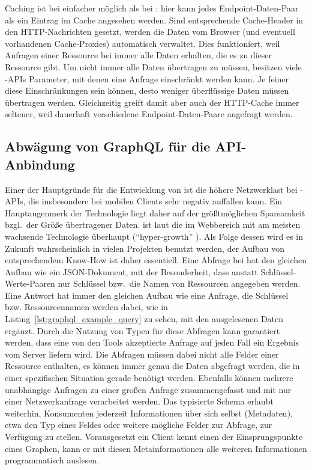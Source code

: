 Caching ist bei  einfacher möglich als bei : hier kann jedes Endpoint-Daten-Paar als ein Eintrag im Cache angesehen werden. Sind entsprechende Cache-Header in den HTTP-Nachrichten gesetzt, werden die Daten vom Browser (und eventuell vorhandenen Cache-Proxies) automatisch verwaltet. Dies funktioniert, weil Anfragen einer Ressource bei  immer alle Daten erhalten, die es zu dieser Ressource gibt. Um nicht immer alle Daten übertragen zu müssen, besitzen viele -APIs Parameter, mit denen eine Anfrage einschränkt werden kann. Je feiner diese Einschränkungen sein können, desto weniger überflüssige Daten müssen übertragen werden. Gleichzeitig greift damit aber auch der HTTP-Cache immer seltener, weil dauerhaft verschiedene Endpoint-Daten-Paare angefragt werden.

\subsection{Abwägung von GraphQL für die API-Anbindung}\label{subsec:graphql}
Einer der Hauptgründe für die Entwicklung von  ist die höhere Netzwerklast bei -APIs, die insbesondere bei mobilen Clients sehr negativ auffallen kann. Ein Hauptaugenmerk der Technologie liegt daher auf der größtmöglichen Sparsamkeit bzgl.\ der Größe übertragener Daten.
 ist laut  die im Webbereich mit am meisten wachsende Technologie überhaupt (\enquote{hyper-growth} \parencite[vgl.]{npmjs_2018}). Als Folge dessen wird es in Zukunft wahrscheinlich in vielen Projekten benutzt werden, der Aufbau von entsprechendem Know-How ist daher essentiell.
Eine Abfrage bei  hat den gleichen Aufbau wie ein JSON-Dokument, mit der Besonderheit, dass anstatt Schlüssel-Werte-Paaren nur Schlüssel bzw.\ die Namen von Ressourcen angegeben werden. Eine Antwort hat immer den gleichen Aufbau wie eine Anfrage, die Schlüssel bzw. Ressourcennamen werden dabei, wie in Listing~\ref{lst:graphql_example_query} zu sehen, mit den ausgelesenen Daten ergänzt. Durch die Nutzung von Typen für diese Abfragen kann garantiert werden, dass eine von den Tools akzeptierte Anfrage auf jeden Fall ein Ergebnis vom Server liefern wird. Die Abfragen müssen dabei nicht alle Felder einer Ressource enthalten, es können immer genau die Daten abgefragt werden, die in einer spezifischen Situation gerade benötigt werden. Ebenfalls können mehrere unabhängige Anfragen zu einer großen Anfrage zusammengefasst und mit nur einer Netzwerkanfrage verarbeitet werden.
Das typisierte Schema erlaubt weiterhin, Konsumenten jederzeit Informationen über sich selbst (Metadaten), etwa den Typ eines Feldes oder weitere mögliche Felder zur Abfrage, zur Verfügung zu stellen. Vorausgesetzt ein Client kennt einen der Einsprungspunkte eines Graphen, kann er mit diesen Metainformationen alle weiteren Informationen programmatisch auslesen. 

